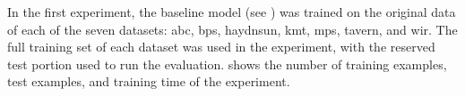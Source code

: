 
In the first experiment, the baseline model (see
) was trained on the original data
of each of the seven datasets: \gls{abc}, \gls{bps},
\gls{haydnsun}, \gls{kmt}, \gls{mps}, \gls{tavern}, and
\gls{wir}. The full training set of each dataset was used in
the experiment, with the reserved test portion used to run
the evaluation.  shows the
number of training examples, test examples, and training
time of the experiment. 


